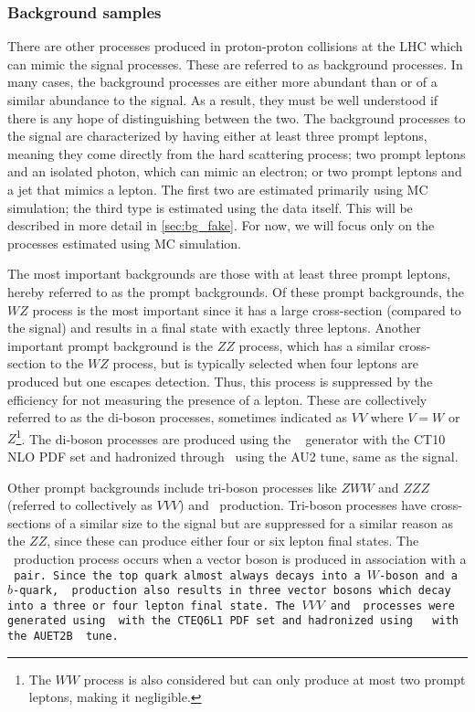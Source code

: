 \subsubsection{Background samples}
\label{sec:www_bg_samples}

There are other processes produced in proton-proton collisions at the LHC
which can mimic the signal processes. These are referred to as background processes.
In many cases, the background processes are either
more abundant than or of a similar abundance to
the signal. As a result, they must be well understood if there is any hope
of distinguishing between the two. The background processes to the signal
are characterized by having either at least three prompt leptons, meaning they
come directly from the hard scattering process;  
two prompt leptons and an isolated photon, which can mimic an electron;
or two prompt leptons and a jet that mimics a lepton.
The first two are estimated primarily using MC simulation; the third type
is estimated using the data itself. 
This will be described in more detail in \sec\ref{sec:bg_fake}.
For now, we will focus only on the processes estimated using MC simulation.

The most important backgrounds are those with at least three prompt leptons, 
hereby referred to as the prompt backgrounds. Of these prompt backgrounds,
the $WZ$ process is the most important since it has a 
large cross-section (compared to the signal)
and results in a final state with exactly three leptons. Another important 
prompt background is the $ZZ$ process,
which has a similar cross-section to the $WZ$ process, but is typically 
selected when 
four leptons are produced but one escapes detection.
Thus, this process is suppressed by the 
efficiency for not measuring the presence of a lepton. 
These are collectively referred to as the di-boson processes, sometimes
indicated as $VV$ where $V = W$ or $Z$\footnote{The $WW$ process is also considered
but can only produce at most two prompt leptons, making it negligible.}. 
The di-boson processes are produced using the 
\powheg~\cite{Alioli:2008gx,Nason:2004rx,Frixione:2007vw,Alioli:2010xd} generator
with the CT10 NLO PDF set and 
hadronized through \pythiaeight~using the AU2 tune, same as the signal.

Other prompt backgrounds 
include tri-boson processes like $ZWW$ and $ZZZ$ 
(referred to collectively as $VVV$)
and \ttV~production. Tri-boson processes
have cross-sections of a similar size to the signal but are suppressed 
for a similar reason
as the $ZZ$, since these can produce either four or six lepton final 
states. 
The \ttV~production process occurs when a vector
boson is produced in association with a \tt~pair. 
Since the top quark almost always decays
into a $W$-boson and a $b$-quark, \ttV~production also results in 
three vector bosons which decay into a three or four lepton
final state.
The $VVV$ and \ttV~processes were generated using \madgraph~with the 
CTEQ6L1 PDF set and hadronized
using \pythiasix~\cite{PYTHIA} with the AUET2B~\cite{atlas:2011zja} 
tune.

